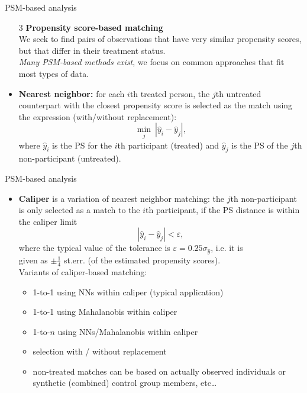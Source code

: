 \documentclass{beamer}
\begin{document}
\begin{frame}{PSM-based analysis}
\begin{enumerate}
    \item[3] \textbf{Propensity score-based matching} \\ \smallskip We seek to find pairs of observations that have very similar propensity scores, but that differ in their treatment status. \\
    \smallskip
    \textit{Many PSM-based methods exist}, we focus on common approaches that fit most types of data.
\end{enumerate}
\begin{itemize}
    \item \textbf{Nearest neighbor:} for each $i$th treated person, the $j$th untreated counterpart with the closest propensity score is selected as the match using the expression (with/without replacement):
    $$
    \underset{j}{\min}~|\hat{y}_i - \hat{y}_j|,
    $$
    where $\hat{y}_i$ is the PS for the $i$th participant (treated) and $\hat{y}_j$ is the PS of the $j$th non-participant (untreated). 
\end{itemize}
\end{frame}
\begin{frame}{PSM-based analysis}
\begin{itemize}
    \item \textbf{Caliper} is a variation of nearest neighbor matching: the $j$th non-participant is only selected as a match to the $i$th participant, if the PS distance is within the caliper limit 
    $$
    |\hat{y}_i - \hat{y}_j| < \varepsilon,
    $$
    where the typical value of the tolerance is $\varepsilon = 0.25 \sigma_{\hat{y}}$, i.e. it is \\given as $\pm \tfrac{1}{4}$ st.err. (of the estimated propensity scores).  \\ \medskip
    Variants of caliper-based matching: \\ \medskip
    \begin{itemize}
        \item 1-to-1 using NNs within caliper (typical application)
        \smallskip
        \item 1-to-1 using Mahalanobis within caliper
        \smallskip
        \item 1-to-$n$ using NNs/Mahalanobis within caliper
        \smallskip
        \item selection with / without replacement
        \item non-treated matches can be based on actually observed individuals or synthetic (combined) control group members, etc\dots
    \end{itemize}
\end{itemize}
\end{frame}
\end{document}
